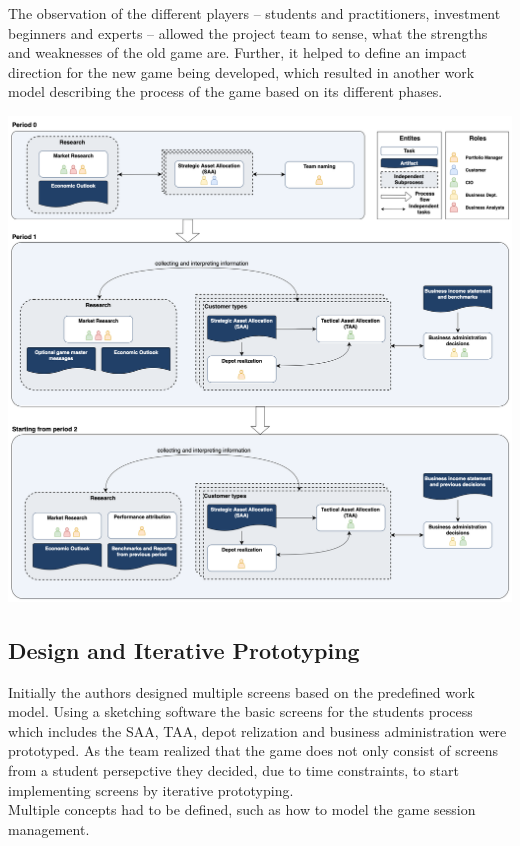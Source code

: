 The observation of the different players – students and practitioners, investment beginners and experts – allowed the project team to sense, what the strengths and weaknesses of the old game are. Further, it helped to define an impact direction for the new game being developed, which resulted in another work model describing the process of the game based on its different phases. %

\begin{center}
  \includegraphics[scale=0.25]{img/work_model_pfm_game.png}
\end{center}

\subsection{Design and Iterative Prototyping}
Initially the authors designed multiple screens based on the predefined work model. Using a sketching software the basic screens for the students process which includes the SAA, TAA, depot relization and business administration were prototyped. As the team realized that the game does not only consist of screens from a student persepctive they decided, due to time constraints, to start implementing screens by iterative prototyping. \\

Multiple concepts had to be defined, such as how to model the game session management.
